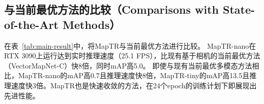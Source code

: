 \documentclass{article} %
\begin{document}
\subsection{与当前最优方法的比较（Comparisons with State-of-the-Art Methods）}
在表~\ref{tab:main-result}中，将MapTR与当前最优方法进行比较。
MapTR-nano在RTX 3090上运行达到实时推理速度（25.1 FPS），比现有基于相机的当前最优方法（VectorMapNet-C）快8倍，同时mAP高5.0。
即使与现有当前最优多模态方法相比，MapTR-nano的mAP高0.7且推理速度快8倍，MapTR-tiny的mAP高13.5且推理速度快3倍。MapTR也是快速收敛的方法，在24个epoch的训练计划下即展现出先进性能。
\end{document}
